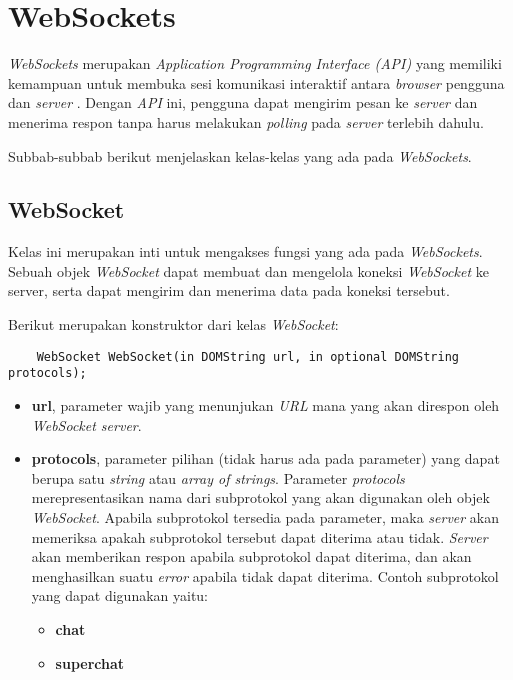 \section{WebSockets}
\label{sec:WebSockets} 

\textit{WebSockets} merupakan \textit{Application Programming Interface (API)} yang memiliki kemampuan untuk membuka sesi komunikasi interaktif antara \textit{browser} pengguna dan \textit{server} \cite{websockets}. Dengan \textit{API} ini, pengguna dapat mengirim pesan ke \textit{server} dan menerima respon tanpa harus melakukan \textit{polling} pada \textit{server} terlebih dahulu.

Subbab-subbab berikut menjelaskan kelas-kelas yang ada pada \textit{WebSockets}.

\subsection{WebSocket}
Kelas ini merupakan inti untuk mengakses fungsi yang ada pada \textit{WebSockets}. Sebuah objek \textit{WebSocket} dapat membuat dan mengelola koneksi \textit{WebSocket} ke server, serta dapat mengirim dan menerima data pada koneksi tersebut. 


Berikut merupakan konstruktor dari kelas \textit{WebSocket}: 
\begin{lstlisting}
	WebSocket WebSocket(in DOMString url, in optional DOMString protocols);
\end{lstlisting}

\begin{itemize}
	\item \textbf{url}, parameter wajib yang menunjukan \textit{URL} mana yang akan direspon oleh \textit{WebSocket server}.
	
	\item \textbf{protocols}, parameter pilihan (tidak harus ada pada parameter) yang dapat berupa satu \textit{string} atau \textit{array of strings}. Parameter \textit{protocols} merepresentasikan nama dari subprotokol yang akan digunakan oleh objek \textit{WebSocket}. Apabila subprotokol tersedia pada parameter, maka \textit{server} akan memeriksa apakah subprotokol tersebut dapat diterima atau tidak. \textit{Server} akan memberikan respon apabila subprotokol dapat diterima, dan akan menghasilkan suatu \textit{error} apabila tidak dapat diterima. Contoh subprotokol yang dapat digunakan yaitu:
	\begin{itemize}
		\item \textbf{chat}
		\item \textbf{superchat}
	\end{itemize}
	
\end{itemize}

